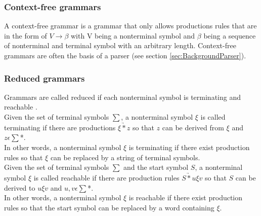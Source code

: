 
\cite{AutomataTheory.2007}

%
%

\subsubsection{Context-free grammars}

A context-free grammar is a grammar that only allows productions rules that are in the form of $V \rightarrow \beta$ with V being a nonterminal symbol and $\beta$ being a sequence of nonterminal and terminal symbol with an arbitrary length.
Context-free grammars are often the basis of a parser (see section \ref{sec:BackgroundParser}). \cite{AutomataTheory.2007}

\subsubsection{Reduced grammars}

Grammars are called reduced if each nonterminal symbol is terminating and reachable \cite{Cremers75}.\\
Given the set of terminal symbols $\sum$, a nonterminal symbol $\xi$ is called terminating if there are productions $\xi \underrightarrow{*} z$ so that $z$ can be derived from $\xi$ and $z \epsilon \sum$*.\\
In other words, a nonterminal symbol $\xi$ is terminating if there exist production rules so that  $\xi$ can be replaced by a string of terminal symbols. \cite{Cremers75}\\
Given the set of terminal symbols $\sum$ and the start symbol $S$, a nonterminal symbol $\xi$ is called reachable if there are production rules $S \underrightarrow{*} u\xi v$ so that $S$ can be derived to $u\xi v$ and $u,v \epsilon \sum$*.\\
In other words, a nonterminal symbol $\xi$ is reachable if there exist production rules so that the start symbol can be replaced by a word containing $\xi$. \cite{Cremers75}

